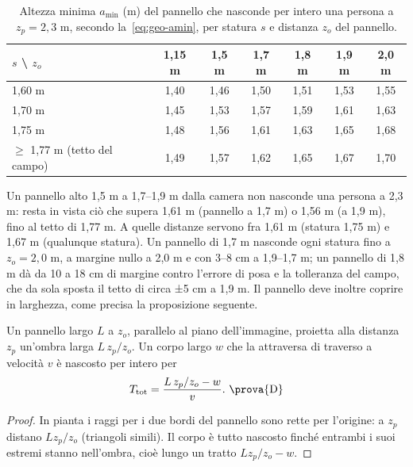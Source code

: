 \begin{table}[htb]\centering\small
\caption{Altezza minima $a_{\min}$ (m) del pannello che nasconde per intero una persona a $z_p=2{,}3$ m, secondo la~\eqref{eq:geo-amin}, per statura $s$ e distanza $z_o$ del pannello. }\label{tab:geo-amin}
\begin{tabular}{@{}lcccccc@{}}
\toprule
$s$ \textbackslash{} $z_o$ & 1,15 m & 1,5 m & 1,7 m & 1,8 m & 1,9 m & 2,0 m\\
\midrule
1,60 m & 1,40 & 1,46 & 1,50 & 1,51 & 1,53 & 1,55\\
1,70 m & 1,45 & 1,53 & 1,57 & 1,59 & 1,61 & 1,63\\
1,75 m & 1,48 & 1,56 & 1,61 & 1,63 & 1,65 & 1,68\\
$\ge$ 1,77 m (tetto del campo) & 1,49 & 1,57 & 1,62 & 1,65 & 1,67 & 1,70\\
\bottomrule
\end{tabular}
\end{table}

Un pannello alto 1,5 m a 1,7--1,9 m dalla camera non nasconde una persona a 2,3 m: resta in vista ciò che supera 1,61 m (pannello a 1,7 m) o 1,56 m (a 1,9 m), fino al tetto di 1,77 m. A quelle distanze servono fra 1,61 m (statura 1,75 m) e 1,67 m (qualunque statura). Un pannello di 1,7 m nasconde ogni statura fino a $z_o=2{,}0$ m, a margine nullo a 2,0 m e con 3--8 cm a 1,9--1,7 m; un pannello di 1,8 m dà da 10 a 18 cm di margine contro l'errore di posa e la tolleranza del campo, che da sola sposta il tetto di circa ±5 cm a 1,9 m. Il pannello deve inoltre coprire in larghezza, come precisa la proposizione seguente.

\begin{proposizione}\label{prop:geo-durata}
Un pannello largo $L$ a $z_o$, parallelo al piano dell'immagine, proietta alla distanza $z_p$ un'ombra larga $L\,z_p/z_o$. Un corpo largo $w$ che la attraversa di traverso a velocità $v$ è nascosto per intero per
\begin{equation}\label{eq:geo-durata}
T_{\mathrm{tot}}=\frac{L\,z_p/z_o-w}{v}.\ \text{\prova{D}}
\end{equation}
\end{proposizione}
\begin{proof}
In pianta i raggi per i due bordi del pannello sono rette per l'origine: a $z_p$ distano $L z_p/z_o$ (triangoli simili). Il corpo è tutto nascosto finché entrambi i suoi estremi stanno nell'ombra, cioè lungo un tratto $L z_p/z_o-w$.
\end{proof}

